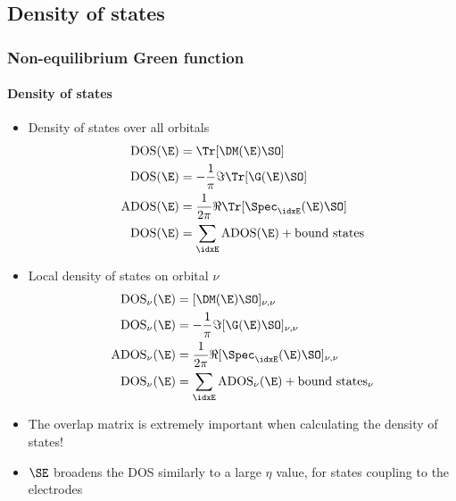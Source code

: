 \subsection{Density of states}

\begin{frame}[label=DOS]
  \frametitle{Non-equilibrium Green function}
  \framesubtitle{Density of states}

  \begin{itemize}
    \item Density of states over all orbitals
    \begin{align*}
      \mathrm{DOS}(\E) &= \Tr[\DM(\E) \SO]
      \\
      \mathrm{DOS}(\E) &= -\frac1\pi\Im\Tr[\G(\E) \SO]
      \\
      \mathrm{ADOS}(\E) &= \frac1{2\pi}\Re\Tr[\Spec_\idxE(\E) \SO]
      \\
      \mathrm{DOS}(\E) &=\sum_\idxE \mathrm{ADOS}(\E) + \text{bound states}
    \end{align*}

    \vspace{-2ex}

    \item Local density of states on orbital $\nu$
    \begin{align*}
      \mathrm{DOS}_\nu(\E) &= [\DM(\E) \SO]_{\nu,\nu}
      \\
      \mathrm{DOS}_\nu(\E) &= -\frac1\pi\Im[\G(\E) \SO]_{\nu,\nu}
      \\
      \mathrm{ADOS}_\nu(\E) &= \frac1{2\pi}\Re[\Spec_\idxE(\E) \SO]_{\nu,\nu}
      \\
      \mathrm{DOS}_\nu(\E) &=\sum_\idxE \mathrm{ADOS}_\nu(\E) + \text{bound states}_\nu
    \end{align*}

    \vspace{-2ex}

    \item<2->%
    The overlap matrix is extremely important when calculating the density of states!

    \item<3->%
    $\SE$ broadens the DOS similarly to a large $\eta$ value, for states
    coupling to the electrodes

  \end{itemize}


\end{frame}


